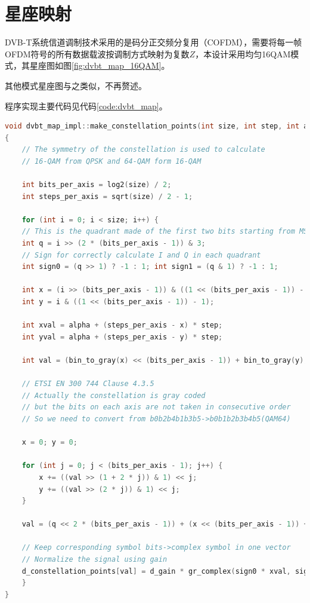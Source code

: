 	\section{星座映射}
		\par DVB-T系统信道调制技术采用的是码分正交频分复用（COFDM），需要将每一帧OFDM符号的所有数据载波按调制方式映射为复数$Z$，本设计采用均匀16QAM模式，其星座图如图\ref{fig:dvbt_map_16QAM}。
		
		\par 其他模式星座图与之类似，不再赘述。
		\par 程序实现主要代码见代码\ref{code:dvbt_map}。
		\begin{lstlisting}[caption = {星座映射},label = {code:dvbt_map}, language = C++ ]
void dvbt_map_impl::make_constellation_points(int size, int step, int alpha)
{
	// The symmetry of the constellation is used to calculate
	// 16-QAM from QPSK and 64-QAM form 16-QAM

	int bits_per_axis = log2(size) / 2;
	int steps_per_axis = sqrt(size) / 2 - 1;

	for (int i = 0; i < size; i++) {
	// This is the quadrant made of the first two bits starting from MSB
	int q = i >> (2 * (bits_per_axis - 1)) & 3;
	// Sign for correctly calculate I and Q in each quadrant
	int sign0 = (q >> 1) ? -1 : 1; int sign1 = (q & 1) ? -1 : 1;

	int x = (i >> (bits_per_axis - 1)) & ((1 << (bits_per_axis - 1)) - 1);
	int y = i & ((1 << (bits_per_axis - 1)) - 1);

	int xval = alpha + (steps_per_axis - x) * step;
	int yval = alpha + (steps_per_axis - y) * step;

	int val = (bin_to_gray(x) << (bits_per_axis - 1)) + bin_to_gray(y);

	// ETSI EN 300 744 Clause 4.3.5
	// Actually the constellation is gray coded
	// but the bits on each axis are not taken in consecutive order
	// So we need to convert from b0b2b4b1b3b5->b0b1b2b3b4b5(QAM64)

	x = 0; y = 0;

	for (int j = 0; j < (bits_per_axis - 1); j++) {
		x += ((val >> (1 + 2 * j)) & 1) << j;
		y += ((val >> (2 * j)) & 1) << j;
	}

	val = (q << 2 * (bits_per_axis - 1)) + (x << (bits_per_axis - 1)) + y;

	// Keep corresponding symbol bits->complex symbol in one vector
	// Normalize the signal using gain
	d_constellation_points[val] = d_gain * gr_complex(sign0 * xval, sign1 * yval);
	}
}
		\end{lstlisting}
